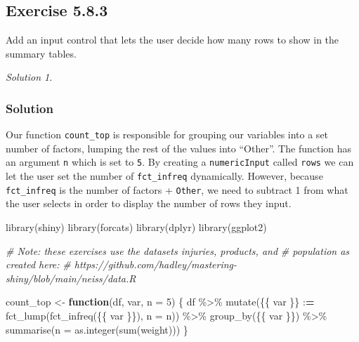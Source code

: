 \documentclass[
]{book}
\newenvironment{Shaded}{\begin{snugshade}}{\end{snugshade}}
\newcommand{\AttributeTok}[1]{\textcolor[rgb]{0.77,0.63,0.00}{#1}}
\newcommand{\CommentTok}[1]{\textcolor[rgb]{0.56,0.35,0.01}{\textit{#1}}}
\newcommand{\ControlFlowTok}[1]{\textcolor[rgb]{0.13,0.29,0.53}{\textbf{#1}}}
\newcommand{\DecValTok}[1]{\textcolor[rgb]{0.00,0.00,0.81}{#1}}
\newcommand{\ErrorTok}[1]{\textcolor[rgb]{0.64,0.00,0.00}{\textbf{#1}}}
\newcommand{\FunctionTok}[1]{\textcolor[rgb]{0.00,0.00,0.00}{#1}}
\newcommand{\NormalTok}[1]{#1}
\newcommand{\OtherTok}[1]{\textcolor[rgb]{0.56,0.35,0.01}{#1}}
\newcommand{\SpecialCharTok}[1]{\textcolor[rgb]{0.00,0.00,0.00}{#1}}
\theoremstyle{definition}
\theoremstyle{definition}
\theoremstyle{definition}
\theoremstyle{definition}
\theoremstyle{remark}
\newtheorem*{solution}{Solution}
\begin{document}
\hypertarget{exercise-5.8.3}{%
\subsection*{Exercise 5.8.3}\label{exercise-5.8.3}}

Add an input control that lets the user decide how many rows to show in the
summary tables.

\begin{solution}
\leavevmode

\hypertarget{solution-20}{%
\subsubsection*{Solution}\label{solution-20}}

Our function \texttt{count\_top} is responsible for grouping our variables into a set
number of factors, lumping the rest of the values into ``Other''. The function
has an argument \texttt{n} which is set to \texttt{5}. By creating a \texttt{numericInput} called
\texttt{rows} we can let the user set the number of \texttt{fct\_infreq} dynamically. However,
because \texttt{fct\_infreq} is the number of factors + \texttt{Other}, we need to subtract 1
from what the user selects in order to display the number of rows they input.

\begin{Shaded}
\begin{Highlighting}[]
\FunctionTok{library}\NormalTok{(shiny)}
\FunctionTok{library}\NormalTok{(forcats)}
\FunctionTok{library}\NormalTok{(dplyr)}
\FunctionTok{library}\NormalTok{(ggplot2)}

\CommentTok{\# Note: these exercises use the datasets \textasciigrave{}injuries\textasciigrave{}, \textasciigrave{}products\textasciigrave{}, and}
\CommentTok{\# \textasciigrave{}population\textasciigrave{} as created here:}
\CommentTok{\# https://github.com/hadley/mastering{-}shiny/blob/main/neiss/data.R}

\NormalTok{count\_top }\OtherTok{\textless{}{-}} \ControlFlowTok{function}\NormalTok{(df, var, }\AttributeTok{n =} \DecValTok{5}\NormalTok{) \{}
\NormalTok{  df }\SpecialCharTok{\%\textgreater{}\%}
    \FunctionTok{mutate}\NormalTok{(\{\{ var \}\} }\SpecialCharTok{:}\ErrorTok{=} \FunctionTok{fct\_lump}\NormalTok{(}\FunctionTok{fct\_infreq}\NormalTok{(\{\{ var \}\}), }\AttributeTok{n =}\NormalTok{ n)) }\SpecialCharTok{\%\textgreater{}\%}
    \FunctionTok{group\_by}\NormalTok{(\{\{ var \}\}) }\SpecialCharTok{\%\textgreater{}\%}
    \FunctionTok{summarise}\NormalTok{(}\AttributeTok{n =} \FunctionTok{as.integer}\NormalTok{(}\FunctionTok{sum}\NormalTok{(weight)))}
\NormalTok{\}}


\end{Highlighting}
\end{Shaded}
\end{solution}
\end{document}
